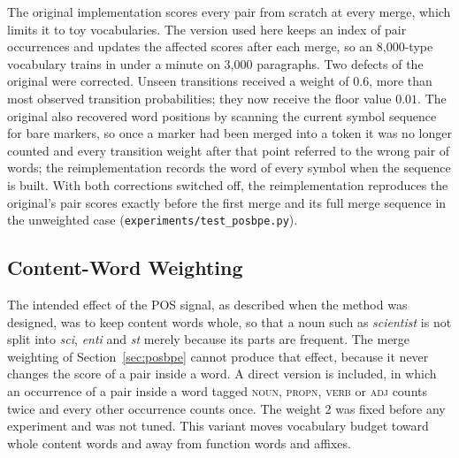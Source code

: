The original implementation scores every pair from scratch at every merge, which limits it to toy vocabularies.
The version used here keeps an index of pair occurrences and updates the affected scores after each merge, so an 8,000-type vocabulary trains in under a minute on 3,000 paragraphs.
Two defects of the original were corrected.
Unseen transitions received a weight of $0.6$, more than most observed transition probabilities; they now receive the floor value $0.01$.
The original also recovered word positions by scanning the current symbol sequence for bare markers, so once a marker had been merged into a token it was no longer counted and every transition weight after that point referred to the wrong pair of words; the reimplementation records the word of every symbol when the sequence is built.
With both corrections switched off, the reimplementation reproduces the original's pair scores exactly before the first merge and its full merge sequence in the unweighted case (\texttt{experiments/test\_posbpe.py}).

\subsection{Content-Word Weighting}\label{sec:content}
The intended effect of the POS signal, as described when the method was designed, was to keep content words whole, so that a noun such as \emph{scientist} is not split into \emph{sci}, \emph{enti} and \emph{st} merely because its parts are frequent.
The merge weighting of Section~\ref{sec:posbpe} cannot produce that effect, because it never changes the score of a pair inside a word.
A direct version is included, in which an occurrence of a pair inside a word tagged \textsc{noun}, \textsc{propn}, \textsc{verb} or \textsc{adj} counts twice and every other occurrence counts once.
The weight 2 was fixed before any experiment and was not tuned.
This variant moves vocabulary budget toward whole content words and away from function words and affixes.

